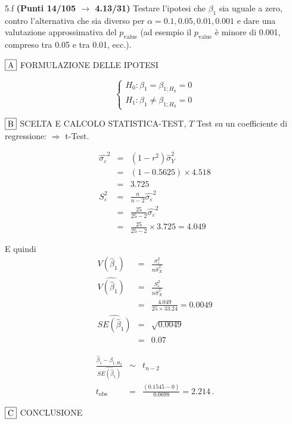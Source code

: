\documentclass[
  11pt,
]{book}
\theoremstyle{mytheoremstyle}
\theoremstyle{mydefstyle}
\newenvironment{sol}
  {
  \begin{tcolorbox}[enhanced,breakable,arc=0.1mm,boxrule=1pt,colback=white,colframe=iblue,
  title=\bf \fontfamily{lmss}\selectfont \hspace{.5 cm} Soluzione,drop fuzzy shadow]

}{
\end{tcolorbox}
  }
\begin{document}
5.f \textbf{(Punti 14/105 \(\rightarrow\) 4.13/31)} Testare l'ipotesi che \(\beta_1\) sia uguale a zero, contro l'alternativa che sia diverso per \(\alpha=0.1,0.05,0.01,0.001\) e dare una valutazione approssimativa del \(p_\text{value}\) (ad esempio il \(p_\text{value}\) è minore di 0.001, compreso tra 0.05 e tra 0.01, ecc.).

\begin{sol}
\(\fbox{A}\) FORMULAZIONE DELLE IPOTESI

\[\begin{cases}
   H_0: \beta_1 = \beta_{1;H_0}=0 \\
   H_1: \beta_1 \neq \beta_{1;H_0}=0 
   \end{cases}\]

\(\fbox{B}\) SCELTA E CALCOLO STATISTICA-TEST, \(T\)
Test su un coefficiente di regressione: \(\Rightarrow\) t-Test.

\begin{eqnarray*}
\hat{\sigma_\varepsilon}^2&=&(1-r^2)\hat\sigma_Y^2\\
&=& (1- 0.5625 )\times 4.518 \\
   &=&  3.725 \\
   S_\varepsilon^2 &=& \frac{n} {n-2} \hat{\sigma_\varepsilon}^2\\
   &=&  \frac{ 25 } { 25 -2} \hat{\sigma_\varepsilon}^2 \\
 &=&  \frac{ 25 } { 25 -2} \times  3.725  =  4.049  
\end{eqnarray*}

E quindi\begin{eqnarray*}
V(\hat\beta_{1}) &=& \frac{\sigma_{\varepsilon}^{2}} {n \hat{\sigma}^{2}_{X}} \\
\widehat{V(\hat\beta_{1})} &=& \frac{S_{\varepsilon}^{2}} {n \hat{\sigma}^{2}_{X}} \\
 &=& \frac{ 4.049 } { 25 \times  33.24 } =  0.0049 \\
 \widehat{SE(\hat\beta_{1})}        &=&  \sqrt{ 0.0049 }\\
 &=&  0.07 
\end{eqnarray*}

\begin{eqnarray*}
 \frac{\hat\beta_{ 1 } - \beta_{ 1 ;H_0}} {\widehat{SE(\hat\beta_{ 1 })}}&\sim&t_{n-2}\\
   t_{\text{obs}}
&=& \frac{ ( 0.1545 -  0 )} { 0.0698 }
 =   2.214 \, .
\end{eqnarray*}

\(\fbox{C}\) CONCLUSIONE


\end{sol}
\end{document}
